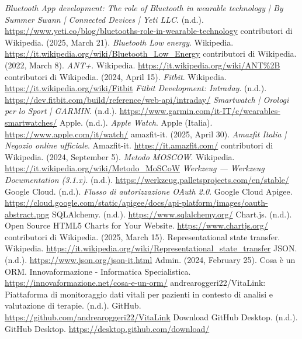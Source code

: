 \documentclass[12pt,a4paper,oneside]{report}
\begin{document}
\begin{thebibliography}{99}
     \textit{Bluetooth App development: The role of Bluetooth in wearable technology | By Summer Swann | Connected Devices | Yeti LLC}. (n.d.). \url{https://www.yeti.co/blog/bluetooths-role-in-wearable-technology}
     contributori di Wikipedia. (2025, March 21). \textit{Bluetooth Low energy}. Wikipedia. \url{https://it.wikipedia.org/wiki/Bluetooth_Low_Energy}
     contributori di Wikipedia. (2022, March 8). \textit{ANT+}. Wikipedia. \url{https://it.wikipedia.org/wiki/ANT%2B}
     contributori di Wikipedia. (2024, April 15). \textit{Fitbit}. Wikipedia. \url{https://it.wikipedia.org/wiki/Fitbit}
     \textit{Fitbit Development: Intraday}. (n.d.). \url{https://dev.fitbit.com/build/reference/web-api/intraday/}
     \textit{Smartwatch | Orologi per lo Sport | GARMIN}. (n.d.). \url{https://www.garmin.com/it-IT/c/wearables-smartwatches/}
     Apple. (n.d.). \textit{Apple Watch}. Apple (Italia). \url{https://www.apple.com/it/watch/}
     amazfit-it. (2025, April 30). \textit{Amazfit Italia | Negozio online ufficiale}. Amazfit-it. \url{https://it.amazfit.com/}
     contributori di Wikipedia. (2024, September 5). \textit{Metodo MOSCOW}. Wikipedia. \url{https://it.wikipedia.org/wiki/Metodo_MoSCoW}
     \textit{Werkzeug — Werkzeug Documentation (3.1.x)}. (n.d.). \url{https://werkzeug.palletsprojects.com/en/stable/}
     Google Cloud. (n.d.). \textit{Flusso di autorizzazione OAuth 2.0}. Google Cloud Apigee. \url{https://cloud.google.com/static/apigee/docs/api-platform/images/oauth-abstract.png}
     SQLAlchemy. (n.d.). \url{https://www.sqlalchemy.org/}
     Chart.js. (n.d.). Open Source HTML5 Charts for Your Website. \url{https://www.chartjs.org/}
     contributori di Wikipedia. (2025, March 15). Representational state transfer. Wikipedia. \url{https://it.wikipedia.org/wiki/Representational_state_transfer}
     JSON. (n.d.). \url{https://www.json.org/json-it.html}
     Admin. (2024, February 25). Cosa è un ORM. Innovaformazione - Informatica Specialistica. \url{https://innovaformazione.net/cosa-e-un-orm/}
     andrearoggeri22/VitaLink: Piattaforma di monitoraggio dati vitali per pazienti in contesto di analisi e valutazione di terapie. (n.d.). GitHub. \url{https://github.com/andrearoggeri22/VitaLink}
     Download GitHub Desktop. (n.d.). GitHub Desktop. \url{https://desktop.github.com/download/}

\end{thebibliography}
\end{document}

